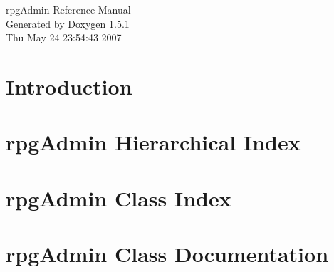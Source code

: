 \documentclass[a4paper]{book}
\begin{document}
\begin{titlepage}
\vspace*{7cm}
\begin{center}
{\Large rpg\-Admin Reference Manual}\\
\vspace*{1cm}
{\large Generated by Doxygen 1.5.1}\\
\vspace*{0.5cm}
{\small Thu May 24 23:54:43 2007}\\
\end{center}
\end{titlepage}
\clearemptydoublepage
{}
\tableofcontents
\clearemptydoublepage
{}
\chapter{Introduction }
\label{index}
\chapter{rpg\-Admin Hierarchical Index}

\chapter{rpg\-Admin Class Index}

\chapter{rpg\-Admin Class Documentation}

\printindex
\end{document}
